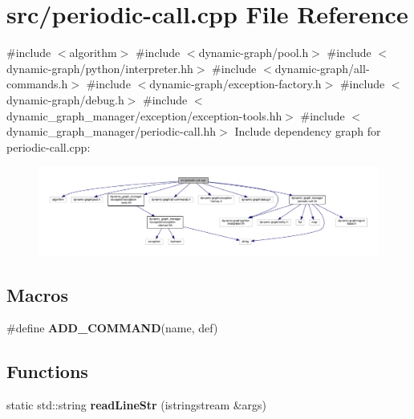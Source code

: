 \hypertarget{periodic-call_8cpp}{}\section{src/periodic-\/call.cpp File Reference}
\label{periodic-call_8cpp}
{\ttfamily \#include $<$algorithm$>$}\newline
{\ttfamily \#include $<$dynamic-\/graph/pool.\+h$>$}\newline
{\ttfamily \#include $<$dynamic-\/graph/python/interpreter.\+hh$>$}\newline
{\ttfamily \#include $<$dynamic-\/graph/all-\/commands.\+h$>$}\newline
{\ttfamily \#include $<$dynamic-\/graph/exception-\/factory.\+h$>$}\newline
{\ttfamily \#include $<$dynamic-\/graph/debug.\+h$>$}\newline
{\ttfamily \#include $<$dynamic\+\_\+graph\+\_\+manager/exception/exception-\/tools.\+hh$>$}\newline
{\ttfamily \#include $<$dynamic\+\_\+graph\+\_\+manager/periodic-\/call.\+hh$>$}\newline
Include dependency graph for periodic-\/call.cpp\+:
\nopagebreak
\begin{figure}[H]
\begin{center}
\leavevmode
\includegraphics[width=350pt]{periodic-call_8cpp__incl}
\end{center}
\end{figure}
\subsection*{Macros}
\begin{DoxyCompactItemize}
\item 
\#define {\bfseries A\+D\+D\+\_\+\+C\+O\+M\+M\+A\+ND}(name,  def)
\end{DoxyCompactItemize}
\subsection*{Functions}
\begin{DoxyCompactItemize}
\item 
\mbox{\label{periodic-call_8cpp_af4062bc26c8f63ecd9875f2dd95aac9c}} 
static std\+::string {\bfseries read\+Line\+Str} (istringstream \&args)
\end{DoxyCompactItemize}


